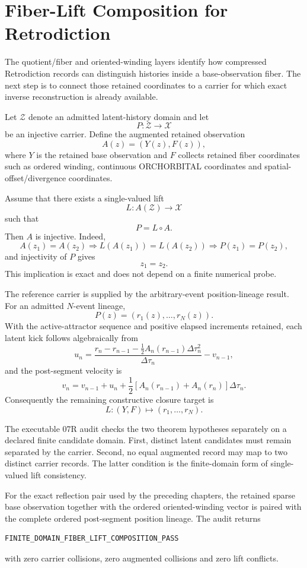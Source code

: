 \chapter{Fiber-Lift Composition for Retrodiction}
\label{chap:fiber-lift-composition}

The quotient/fiber and oriented-winding layers identify how compressed Retrodiction records can distinguish histories inside a base-observation fiber.  The next step is to connect those retained coordinates to a carrier for which exact inverse reconstruction is already available.

Let \(\mathcal Z\) denote an admitted latent-history domain and let
\[
P:\mathcal Z\to\mathcal X
\]
be an injective carrier.  Define the augmented retained observation
\[
\boxed{A(z)=(Y(z),F(z)),}
\]
where \(Y\) is the retained base observation and \(F\) collects retained fiber coordinates such as ordered winding, continuous ORCHORBITAL coordinates and spatial-offset/divergence coordinates.

Assume that there exists a single-valued lift
\[
L:A(\mathcal Z)\to\mathcal X
\]
such that
\[
\boxed{P=L\circ A.}
\]
Then \(A\) is injective.  Indeed,
\[
A(z_1)=A(z_2)
\Longrightarrow
L(A(z_1))=L(A(z_2))
\Longrightarrow
P(z_1)=P(z_2),
\]
and injectivity of \(P\) gives
\[
\boxed{z_1=z_2.}
\]
This implication is exact and does not depend on a finite numerical probe.

The reference carrier is supplied by the arbitrary-event position-lineage result.  For an admitted \(N\)-event lineage,
\[
\boxed{P(z)=(r_1(z),\ldots,r_N(z)).}
\]
With the active-attractor sequence and positive elapsed increments retained, each latent kick follows algebraically from
\[
\boxed{
u_n=
\frac{r_n-r_{n-1}-\frac12A_n(r_{n-1})\Delta\tau_n^2}
{\Delta\tau_n}
-v_{n-1},}
\]
and the post-segment velocity is
\[
\boxed{
v_n=v_{n-1}+u_n+
\frac12\left[A_n(r_{n-1})+A_n(r_n)\right]\Delta\tau_n.}
\]
Consequently the remaining constructive closure target is
\[
\boxed{
L:(Y,F)\mapsto(r_1,\ldots,r_N).
}
\]

The executable 07R audit checks the two theorem hypotheses separately on a declared finite candidate domain.  First, distinct latent candidates must remain separated by the carrier.  Second, no equal augmented record may map to two distinct carrier records.  The latter condition is the finite-domain form of single-valued lift consistency.

For the exact reflection pair used by the preceding chapters, the retained sparse base observation together with the ordered oriented-winding vector is paired with the complete ordered post-segment position lineage.  The audit returns
\begin{verbatim}
FINITE_DOMAIN_FIBER_LIFT_COMPOSITION_PASS
\end{verbatim}
with zero carrier collisions, zero augmented collisions and zero lift conflicts.

